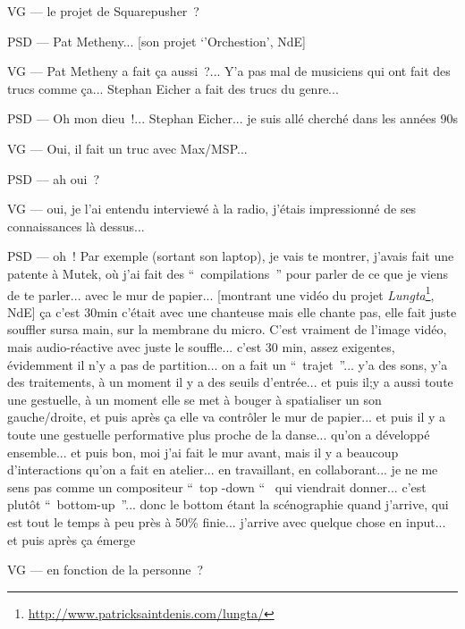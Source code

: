 VG — le projet de Squarepusher ?

PSD — Pat Metheny... [son projet `'Orchestion', NdE]

VG — Pat Metheny a fait ça aussi ?... Y'a pas mal de musiciens qui ont fait des trucs comme ça... Stephan Eicher a fait des trucs du genre...

PSD — Oh mon dieu !... Stephan Eicher... je suis allé cherché dans les années 90s

VG — Oui, il fait un truc avec Max/MSP...

PSD — ah oui ?

VG — oui, je l'ai entendu interviewé à la radio, j'étais impressionné de ses connaissances là dessus...

PSD — oh ! Par exemple (sortant son laptop), je vais te montrer, j'avais fait une patente à Mutek, où j'ai fait des “ compilations ” pour parler de ce que je viens de te parler... avec le mur de papier... [montrant une vidéo du projet \textit{Lungta}\footnote{\url{http://www.patricksaintdenis.com/lungta/}}, NdE] ça c'est 30min c'était avec une chanteuse mais elle chante pas, elle fait juste souffler sursa main, sur  la membrane du micro. C'est vraiment de l'image vidéo, mais audio-réactive avec juste le souffle... c'est 30 min, assez exigentes, évidemment il n'y a pas de partition... on a fait un “ trajet ”... y'a des sons, y'a des traitements, à un moment il y a des seuils d'entrée... et puis il;y a aussi toute une gestuelle, à un moment elle se met à bouger à spatialiser un son gauche/droite, et puis après ça elle va contrôler le mur de papier... et puis il y a toute une gestuelle performative plus proche de la danse... qu'on a développé ensemble... et puis bon, moi j'ai fait le mur avant, mais il y a beaucoup d'interactions qu'on a fait en atelier... en travaillant, en collaborant... je ne me sens pas comme un compositeur “ top -down “  qui viendrait donner... c'est plutôt “ bottom-up ”... donc le bottom étant la scénographie quand j'arrive, qui est tout le temps à peu près à 50\% finie... j'arrive avec quelque chose en input... et puis après ça émerge

VG — en fonction de la personne ?

